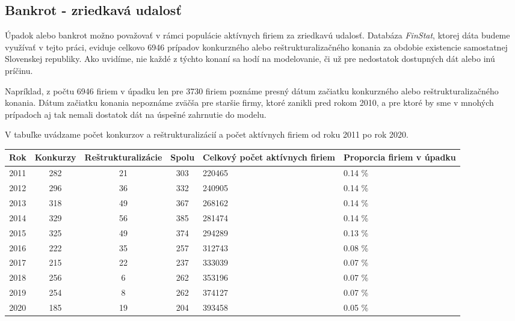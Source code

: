 \subsection{Bankrot - zriedkavá udalosť}

Úpadok alebo bankrot možno považovať v rámci populácie aktívnych firiem za zriedkavú udalosť.
Databáza \emph{FinStat}, ktorej dáta budeme využívať v tejto práci, eviduje celkovo 6946 prípadov konkurzného alebo reštrukturalizačného konania za obdobie existencie samostatnej Slovenskej republiky.
Ako uvidíme, nie každé z týchto konaní sa hodí na modelovanie, či už pre nedostatok dostupných dát alebo inú príčinu.

Napríklad, z počtu 6946 firiem v úpadku len pre 3730 firiem poznáme presný dátum začiatku konkurzného alebo reštrukturalizačného konania.
Dátum začiatku konania nepoznáme zväčša pre staršie firmy, ktoré zanikli pred rokom 2010, a pre ktoré by sme v mnohých prípadoch aj tak nemali dostatok dát na úspešné zahrnutie do modelu.

V tabuľke uvádzame počet konkurzov a reštrukturalizácií a počet aktívnych firiem od roku 2011 po rok 2020.

\begin{center}
    \begin{tabular}{ |c|c|c|c|p{3cm}|p{3cm}| }
        \hline
        Rok & Konkurzy & Reštrukturalizácie & Spolu & Celkový počet aktívnych firiem & Proporcia firiem v úpadku \\
        \hline
        2011 & 282 & 21 & 303 & 220465 & 0.14 \% \\
        \hline
        2012 & 296 & 36 & 332 & 240905 & 0.14 \% \\
        \hline
        2013 & 318 & 49 & 367 & 268162 & 0.14 \% \\
        \hline
        2014 & 329 & 56 & 385 & 281474 & 0.14 \% \\
        \hline
        2015 & 325 & 49 & 374 & 294289 & 0.13 \%\\
        \hline
        2016 & 222 & 35 & 257 & 312743 & 0.08 \%\\
        \hline
        2017 & 215 & 22 & 237 & 333039 & 0.07 \% \\
        \hline
        2018 & 256 & 6 & 262 & 353196 & 0.07 \% \\
        \hline
        2019 & 254 & 8 & 262 & 374127 & 0.07 \% \\
        \hline
        2020 & 185 & 19 & 204 & 393458 & 0.05 \% \\
        \hline
    \end{tabular}
\end{center}
\bigskip

